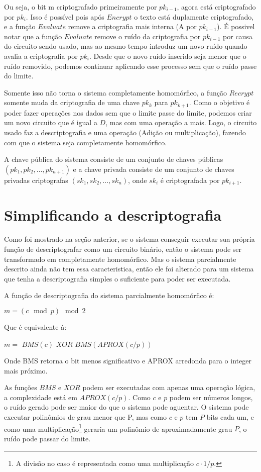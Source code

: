 Ou seja, o bit m criptografado primeiramente por $pk_{i-1}$, agora está criptografado por $pk_{i}$.
Isso é possível pois após $Encrypt$ o texto está duplamente criptografado, e a função $Evaluate$ remove a criptografia mais interna (A por $pk_{i-1}$).
É possivel notar que a função $Evaluate$ remove o ruído da criptografia por $pk_{i-1}$ por causa do circuito sendo usado, mas ao mesmo tempo introduz um novo ruído quando avalia a criptografia por $pk_i$.
Desde que o novo ruído inserido seja menor que o ruído removido, podemos continuar aplicando esse processo sem que o ruído passe do limite.
  
Somente isso não torna o sistema completamente homomórfico, a função $Recrypt$ somente muda da criptografia de uma chave $pk_k$ para $pk_{k+1}$.
Como o objetivo é poder fazer operações nos dados sem que o limite passe do limite, podemos criar um novo circuito que é igual a $D$, mas com uma operação a mais.
Logo, o circuito usado faz a descriptografia e uma operação (Adição ou multiplicação), fazendo com que o sistema seja completamente homomórfico.
  
A chave pública do sistema consiste de um conjunto de chaves públicas $(pk_1, pk_2, ..., pk_{n+1})$ e a chave privada consiste de um conjunto de chaves privadas criptografas $(sk_1, sk_2, ..., sk_n)$, onde $sk_i$ é criptografada por $pk_{i+1}$.

\section{Simplificando a descriptografia}
Como foi mostrado na seção anterior, se o sistema conseguir executar sua própria função de descriptografar como um circuito binário, então o sistema pode ser transformado em completamente homomórfico.
Mas o sistema parcialmente descrito ainda não tem essa caracteristica, então ele foi alterado para um sistema que tenha a descriptografia simples o suficiente para poder ser executada.
  	
A função de descriptografia do sistema parcialmente homomórfico é:
\begin{center} $m = (c \mod p) \mod 2$ \end{center}
Que é equivalente à:
\begin{center} $m =$ $BMS(c)$ $XOR$ $BMS(APROX(c/p))$ \end{center}
Onde BMS retorna o bit menos significativo e APROX arredonda para o integer mais próximo.
  	
As funções $BMS$ e $XOR$ podem ser executadas com apenas uma operação lógica, a complexidade está em $APROX(c/p)$. Como $c$ e $p$ podem ser números longos, o ruído gerado pode ser maior do que o sistema pode aguentar. O sistema pode executar polinômios de grau menor que P, mas como $c$ e $p$ tem $P$ bits cada um, e como uma multiplicação\footnote{A divisão no caso é representada como uma multiplicação $c \cdot 1/p$.} geraria um polinômio de aproximadamente grau $P$, o ruído pode passar do limite.
  	
